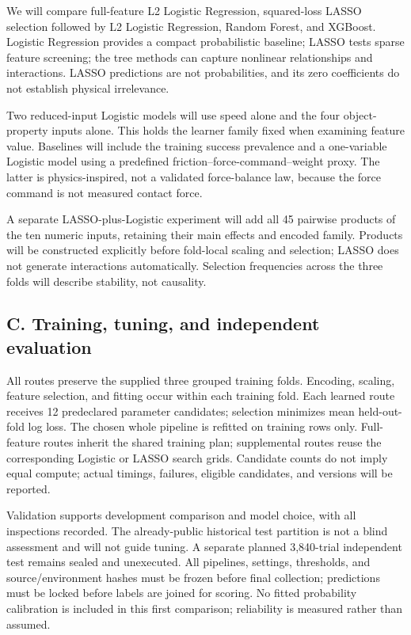 \documentclass[11pt,letterpaper]{article}
\begin{document}
We will compare full-feature L2 Logistic Regression, squared-loss LASSO selection followed by L2 Logistic Regression, Random Forest, and XGBoost. Logistic Regression provides a compact probabilistic baseline; LASSO tests sparse feature screening; the tree methods can capture nonlinear relationships and interactions. LASSO predictions are not probabilities, and its zero coefficients do not establish physical irrelevance.

Two reduced-input Logistic models will use speed alone and the four object-property inputs alone. This holds the learner family fixed when examining feature value. Baselines will include the training success prevalence and a one-variable Logistic model using a predefined friction–force-command–weight proxy. The latter is physics-inspired, not a validated force-balance law, because the force command is not measured contact force.

A separate LASSO-plus-Logistic experiment will add all 45 pairwise products of the ten numeric inputs, retaining their main effects and encoded family. Products will be constructed explicitly before fold-local scaling and selection; LASSO does not generate interactions automatically. Selection frequencies across the three folds will describe stability, not causality.

\subsection*{C. Training, tuning, and independent evaluation}

All routes preserve the supplied three grouped training folds. Encoding, scaling, feature selection, and fitting occur within each training fold. Each learned route receives 12 predeclared parameter candidates; selection minimizes mean held-out-fold log loss. The chosen whole pipeline is refitted on training rows only. Full-feature routes inherit the shared training plan; supplemental routes reuse the corresponding Logistic or LASSO search grids. Candidate counts do not imply equal compute; actual timings, failures, eligible candidates, and versions will be reported.

Validation supports development comparison and model choice, with all inspections recorded. The already-public historical test partition is not a blind assessment and will not guide tuning. A separate planned 3,840-trial independent test remains sealed and unexecuted. All pipelines, settings, thresholds, and source/environment hashes must be frozen before final collection; predictions must be locked before labels are joined for scoring. No fitted probability calibration is included in this first comparison; reliability is measured rather than assumed.
\end{document}
